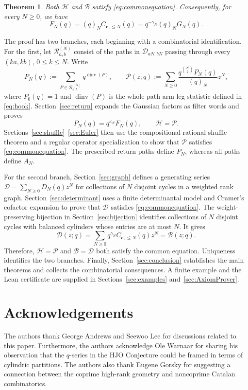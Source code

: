 \documentclass[12pt,reqno]{amsart}
\numberwithin{equation}{section}
\newtheorem{theorem}{Theorem}[section]
\theoremstyle{definition}
\theoremstyle{remark}
\theoremstyle{plain}
\newcommand{\cc}{\mathbf c}
\DeclareMathOperator{\dinv}{dinv}
\newcommand{\Hseries}{\mathscr H}
\newcommand{\Dseries}{\mathscr D}
\newcommand{\Bseries}{\mathscr B}
\newcommand{\Pseries}{\mathscr P}
\newcommand{\Rpaths}{\mathcal R_{a,b}^{(N)}}
\begin{document}
\begin{theorem}\label{thm:common}
Both $\Hseries$ and $\Bseries$ satisfy \eqref{eq:commonequation}.
Consequently, for every $N\ge0$, we have
\begin{equation}\label{eq:commoncoefficients}
 F_N(q)=(q)_N C_{\cc,\le N}(q)
       =q^{-\gamma_N}(q)_N G_N(q).
\end{equation}
\end{theorem}
The proof has two branches, each beginning with a combinatorial
identification.
For the first, let $\Rpaths$ consist of the paths in
$\mathcal D_{aN,bN}$ passing through every $(ka,kb)$, $0\le k\le N$.
Write
\begin{equation}\label{eq:pathseries}
 P_N(q):=\sum_{P\in\Rpaths}q^{\dinv(P)},\qquad
 \Pseries(z;q):=\sum_{N\ge0}\frac{q^{\binom N2}P_N(q)}{(q)_N}z^N,
\end{equation}
where $P_0(q)=1$ and $\dinv(P)$ is the whole-path arm-leg statistic
defined in \eqref{eq:hook}.  Section~\ref{sec:return} expands the Gaussian
factors as filter words and proves
\[
 P_N(q)=q^{\kappa_N}F_N(q),\qquad \Hseries=\Pseries.
\]
Sections~\ref{sec:shuffle}--\ref{sec:Euler} then use the compositional
rational shuffle theorem and a regular operator specialization to show
that $\Pseries$ satisfies \eqref{eq:commonequation}.
The prescribed-return paths define $P_N$, whereas all paths define $A_N$.

For the second branch, Section~\ref{sec:graph} defines a generating
series $\Dseries=\sum_{N\ge 0} D_N(q)z^N$ for collections of $N$ disjoint cycles in a weighted rank graph.  Section~\ref{sec:determinant}
uses a finite determinantal model and Cramer's cofactor expansion to prove that $\Dseries$ satisfies \eqref{eq:commonequation}.
The weight-preserving bijection in Section~\ref{sec:bijection} identifies
collections of $N$ disjoint cycles with balanced cylinders whose entries
are at most $N$.  It gives
\[
 \Dseries(z;q)=\sum_{N\ge0}q^{\gamma_N}C_{\cc,\le N}(q)z^N=\Bseries(z;q).
\]
Therefore, $\Hseries=\Pseries$ and $\Bseries=\Dseries$ both satisfy the common
equation.  Uniqueness identifies the two branches.  
Finally, Section~\ref{sec:conclusion} establishes the main theorems and collects the combinatorial consequences. A finite example and the Lean certificate
are supplied in Sections~\ref{sec:examples} and~\ref{sec:AxiomProver}.


\section*{Acknowledgements} \noindent The authors thank George Andrews and Seewoo Lee for discussions related to this paper. Furthermore, the authors acknowledge Ole Warnaar for sharing his observation that the $q$-series in the HJO Conjecture could be framed in terms of cylindric partitions. 
The authors also thank Eugene Gorsky for suggesting a connection between the coprime high-rank geometry and noncoprime Catalan combinatorics.
\end{document}
